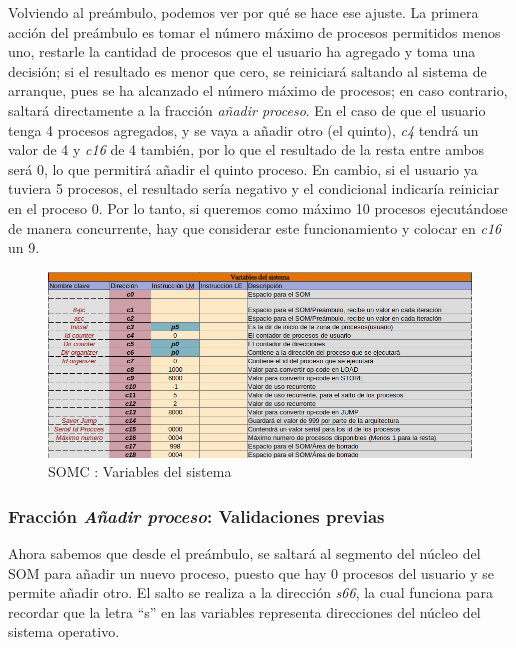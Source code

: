 \documentclass[letterpaper,12pt,oneside]{book}
\begin{document}
            Volviendo al preámbulo, podemos ver por qué se hace ese ajuste. La primera acción del preámbulo
			es tomar el número máximo de procesos permitidos menos uno, restarle la cantidad
			de procesos que el usuario ha agregado y toma una decisión; si el resultado es menor que cero, se reiniciará saltando
			al sistema de arranque, pues se ha alcanzado el número máximo de procesos; en caso
			contrario, saltará directamente a la fracción  \textit{añadir proceso}. En el caso de que el usuario tenga 4 procesos agregados, y se vaya a 
			añadir 
			otro (el quinto),
			\textit{c4} tendrá un valor de 4 y \textit{c16} de 4 también, por lo que el resultado de la resta entre ambos será 0, lo que permitirá 
			añadir el quinto proceso. En
			cambio, si el usuario ya tuviera 5 procesos, el resultado sería negativo y el condicional indicaría reiniciar en el proceso 0. Por lo tanto,
			si queremos como máximo 10 procesos ejecutándose de manera concurrente, hay que considerar este funcionamiento y colocar en \textit{c16} un 
			9.
			
						
			
			\begin{figure}[h]		
			\centering
			\includegraphics[scale=0.56]{media/CARDIACC/VariablesDelSistema.png}
			\caption{SOMC : Variables del sistema}
			\label{fig:somcVariablesSis}
		\end{figure}

            \subsubsection{Fracción \textit{Añadir proceso}: Validaciones previas}
			Ahora sabemos que desde el preámbulo, se saltará al segmento del núcleo del SOM para añadir un nuevo proceso, puesto
			que hay 0 procesos del usuario y se permite añadir otro. El salto se realiza a la dirección \textit{s66}, la cual funciona para recordar
			que la letra ``s'' en las variables representa
			direcciones del núcleo del sistema operativo.
   
\end{document}
